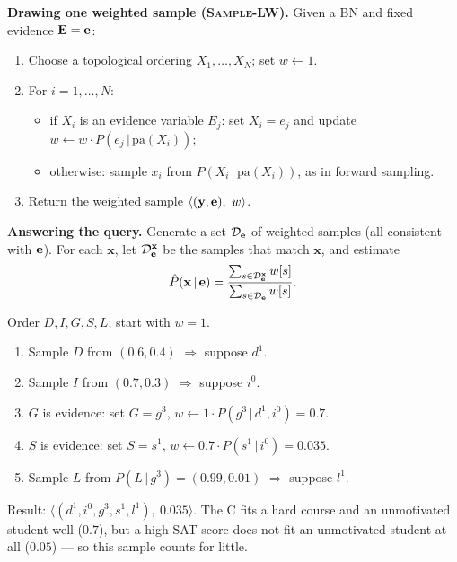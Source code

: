 \documentclass[11pt, oneside]{book}
\newcommand{\Prob}{\mathbb{P}}           %
\newcommand{\dataset}{\mathcal{D}}       %
\newcommand{\given}{\,\vert\,}           %
\newcommand{\pa}{\mathrm{pa}}            %
\newcommand{\bx}{\mathbf{x}}  \newcommand{\by}{\mathbf{y}}
\begin{document}
\begin{thmbox}[title={Likelihood weighting (LW)}]
\textbf{Drawing one weighted sample (\textsc{Sample-LW}).} Given a BN and
fixed evidence $\mathbf{E} = \mathbf{e}$:
\begin{enumerate}
  \item Choose a topological ordering $X_1, \ldots, X_N$; set $w \leftarrow 1$.
  \item For $i = 1, \ldots, N$:
  \begin{itemize}
    \item if $X_i$ is an evidence variable $E_j$: set $X_i = e_j$ and update
      $w \leftarrow w \cdot P(e_j \given \pa(X_i))$;
    \item otherwise: sample $x_i$ from $P(X_i \given \pa(X_i))$, as in
      forward sampling.
  \end{itemize}
  \item Return the weighted sample $\langle (\by, \be),\ w \rangle$.
\end{enumerate}
\textbf{Answering the query.} Generate a set $\dataset_{\be}$ of weighted
samples (all consistent with $\mathbf{e}$). For each $\bx$, let $\dataset_{\be}^{\bx}$
be the samples that match $\bx$, and estimate
\[
\hat P(\bx \given \be) = \frac{\sum_{s \in \dataset_{\be}^{\bx}} w[s]}{\sum_{s \in \dataset_{\be}} w[s]} .
\]
\end{thmbox}

\begin{exbox}[title={One weighted sample for $P(I \given g^3, s^1)$ (from the slides)}]
Order $D, I, G, S, L$; start with $w = 1$.
\begin{enumerate}
  \item Sample $D$ from $(0.6, 0.4)$ $\Rightarrow$ suppose $d^1$.
  \item Sample $I$ from $(0.7, 0.3)$ $\Rightarrow$ suppose $i^0$.
  \item $G$ is evidence: set $G = g^3$, $w \leftarrow 1 \cdot P(g^3 \given d^1, i^0) = 0.7$.
  \item $S$ is evidence: set $S = s^1$, $w \leftarrow 0.7 \cdot P(s^1 \given i^0) = 0.035$.
  \item Sample $L$ from $P(L \given g^3) = (0.99, 0.01)$ $\Rightarrow$ suppose $l^1$.
\end{enumerate}
Result: $\langle (d^1, i^0, g^3, s^1, l^1),\ 0.035 \rangle$. The C fits a hard
course and an unmotivated student well ($0.7$), but a high SAT score does
not fit an unmotivated student at all ($0.05$) --- so this sample counts for
little.
\end{exbox}
\end{document}
